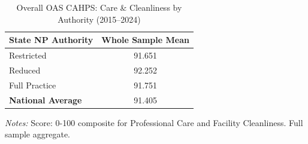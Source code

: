 \begin{table}[htbp]
    \centering
    \caption{Overall OAS CAHPS: Care \& Cleanliness by Authority (2015--2024)}
    \label{tab:oas_grp2_full}
    \vspace{0.2cm}
    \begin{tabular}{lc}
        \toprule
        \textbf{State NP Authority} & \textbf{Whole Sample Mean} \\
        \midrule
        Restricted & 91.651 \\
        Reduced & 92.252 \\
        Full Practice & 91.751 \\
        \midrule
        \textbf{National Average} & 91.405 \\
        \bottomrule
    \end{tabular}
    \vspace{0.1cm}
    \begin{minipage}{0.6\textwidth}
        \footnotesize \textit{Notes:} Score: 0-100 composite for Professional Care and Facility Cleanliness. Full sample aggregate.
    \end{minipage}
\end{table}